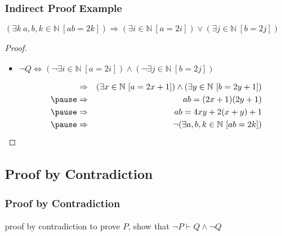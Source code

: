 \documentclass[dvipsnames]{beamer}
\begin{document}
\begin{frame}
  \frametitle{Indirect Proof Example}

  \begin{theorem}
    $(\exists k~a,b,k \in \mathbb{N}~[ab=2k]) \Rightarrow
      (\exists i \in \mathbb{N}~[a=2i]) \vee
      (\exists j \in \mathbb{N}~[b=2j])$
  \end{theorem}

  \pause
  \begin{proof}
    \begin{itemize}
      \item $\neg Q \Leftrightarrow (\neg \exists i \in \mathbb{N}~[a=2i])
                          \wedge (\neg \exists j \in \mathbb{N}~[b=2j])$
    \end{itemize}

    \pause
    \begin{eqnarray*}
      & \Rightarrow & (\exists x \in \mathbb{N}~[a=2x+1])
               \wedge (\exists y \in \mathbb{N}~[b=2y+1])\\\pause
      & \Rightarrow & ab=(2x+1)(2y+1)\\\pause
      & \Rightarrow & ab=4xy+2(x+y)+1\\\pause
      & \Rightarrow & \neg (\exists a,b,k \in \mathbb{N}~[ab=2k])
    \end{eqnarray*}
  \end{proof}
\end{frame}

\subsection{Proof by Contradiction}

\begin{frame}
  \frametitle{Proof by Contradiction}

  \begin{block}{proof by contradiction}
    to prove $P$, show that $\neg P \vdash Q \wedge \neg Q$
  \end{block}
\end{frame}
\end{document}
